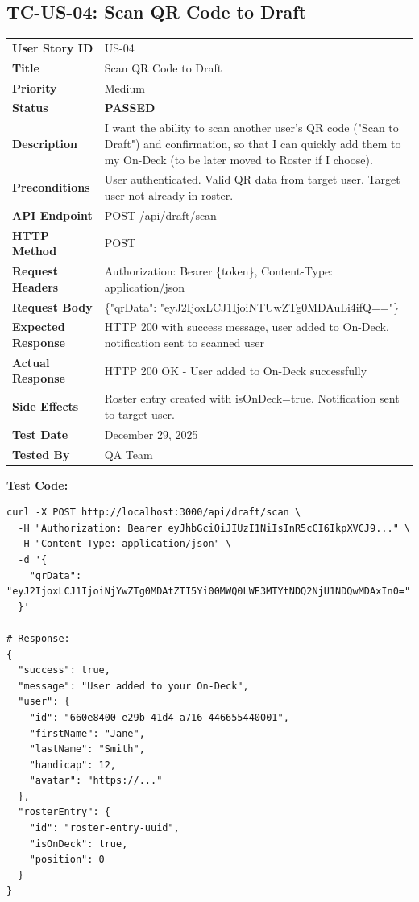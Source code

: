 \documentclass[11pt,a4paper]{article}
\newcommand{\passed}{\textcolor{pass}{\textbf{PASSED}}}
\begin{document}
\vspace{0.5cm}


\subsection{TC-US-04: Scan QR Code to Draft}

\begin{tabularx}{\textwidth}{|p{3.2cm}|Y|}
\hline
{}
 \\
\hline
\textbf{User Story ID} & US-04 \\
\hline
\textbf{Title} & Scan QR Code to Draft \\
\hline
\textbf{Priority} & Medium \\
\hline
\textbf{Status} & \passed \\
\hline
\textbf{Description} & I want the ability to scan another user's QR code ("Scan to Draft") and confirmation, so that I can quickly add them to my On-Deck (to be later moved to Roster if I choose). \\
\hline
\textbf{Preconditions} & User authenticated. Valid QR data from target user. Target user not already in roster. \\
\hline
\textbf{API Endpoint} & POST /api/draft/scan \\
\hline
\textbf{HTTP Method} & POST \\
\hline
\textbf{Request Headers} & Authorization: Bearer \{token\}, Content-Type: application/json \\
\hline
\textbf{Request Body} & \{"qrData": "eyJ2IjoxLCJ1IjoiNTUwZTg0MDAuLi4ifQ=="\} \\
\hline
\textbf{Expected Response} & HTTP 200 with success message, user added to On-Deck, notification sent to scanned user \\
\hline
\textbf{Actual Response} & HTTP 200 OK - User added to On-Deck successfully \\
\hline
\textbf{Side Effects} & Roster entry created with isOnDeck=true. Notification sent to target user. \\
\hline
\textbf{Test Date} & December 29, 2025 \\
\hline
\textbf{Tested By} & QA Team \\
\hline
\end{tabularx}

\vspace{0.3cm}
\textbf{Test Code:}
\begin{lstlisting}
curl -X POST http://localhost:3000/api/draft/scan \
  -H "Authorization: Bearer eyJhbGciOiJIUzI1NiIsInR5cCI6IkpXVCJ9..." \
  -H "Content-Type: application/json" \
  -d '{
    "qrData": "eyJ2IjoxLCJ1IjoiNjYwZTg0MDAtZTI5Yi00MWQ0LWE3MTYtNDQ2NjU1NDQwMDAxIn0="
  }'

# Response:
{
  "success": true,
  "message": "User added to your On-Deck",
  "user": {
    "id": "660e8400-e29b-41d4-a716-446655440001",
    "firstName": "Jane",
    "lastName": "Smith",
    "handicap": 12,
    "avatar": "https://..."
  },
  "rosterEntry": {
    "id": "roster-entry-uuid",
    "isOnDeck": true,
    "position": 0
  }
}
\end{lstlisting}
\end{document}
